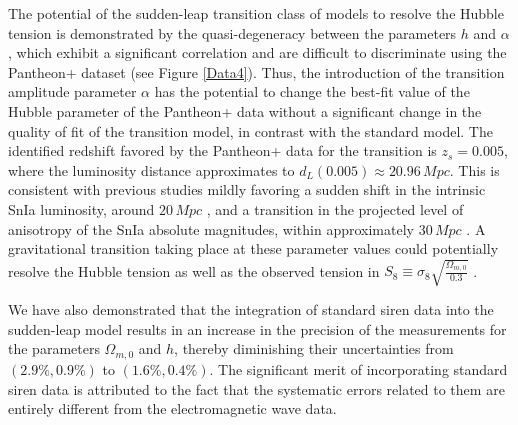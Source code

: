 \documentclass[universe,article,accept,moreauthors,pdftex]{Definitions/mdpi}
\begin{document}
The potential of the sudden-leap transition class of models to resolve the Hubble tension is demonstrated by the quasi-degeneracy between the parameters $h$ and $\alpha$, which exhibit a significant correlation and are difficult to discriminate using the Pantheon+ dataset (see Figure \ref{Data4}). Thus, the introduction of the transition amplitude parameter $\alpha$ has the potential to change the best-fit value of the Hubble parameter of the Pantheon+ data without a significant change in the quality of fit of the transition model, in contrast with the standard \lcdm model. The identified redshift favored by the Pantheon+ data  for the transition is $z_s=0.005$, where the luminosity distance approximates to $d_L(0.005)\approx 20.96\,Mpc$. This is consistent with previous studies mildly %
favoring a sudden shift in the intrinsic SnIa luminosity, around $20\,Mpc$ \cite{Perivolaropoulos:2023iqj}, and a transition in the projected level of anisotropy of the SnIa absolute magnitudes, within approximately $30\, Mpc$ \cite{Perivolaropoulos:2023tdt}. A gravitational transition taking place at these parameter values \cite{Perivolaropoulos:2022khd} could potentially resolve the Hubble tension as well as the observed tension in $S_{8}\equiv \sigma_{8}\sqrt{\frac{\Omega_{m,0}}{0.3}}$ \cite{Marra:2021fvf}.

We have also demonstrated that the integration of standard siren data into the sudden-leap model results in an increase in the precision of the measurements for the parameters $\Omega_{m,0}$ and $h$, thereby diminishing their uncertainties from $(2.9\%,0.9\%)$ to $(1.6\%, 0.4\%)$. The significant merit of incorporating standard siren data is attributed to the fact that the systematic errors related to them are entirely different from the electromagnetic wave data.
\end{document}
